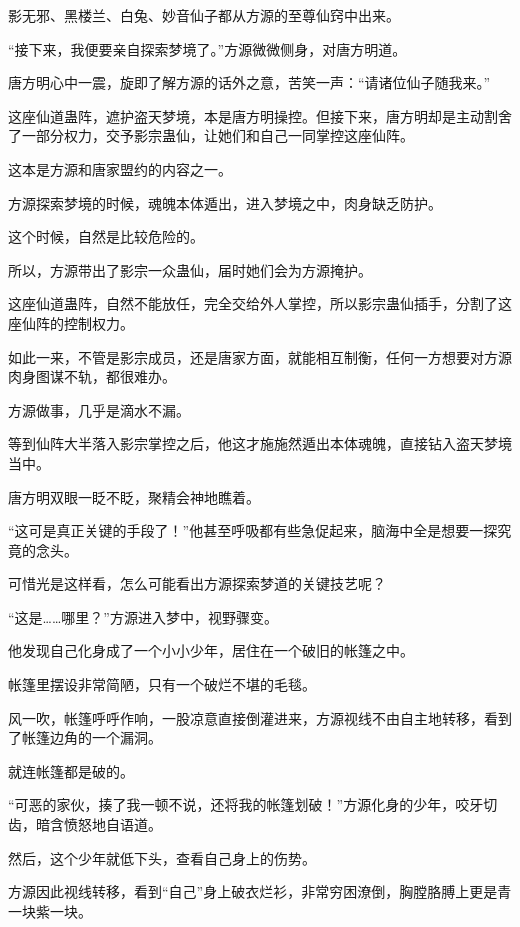 
\begin{this_body}

影无邪、黑楼兰、白兔、妙音仙子都从方源的至尊仙窍中出来。

“接下来，我便要亲自探索梦境了。”方源微微侧身，对唐方明道。

唐方明心中一震，旋即了解方源的话外之意，苦笑一声：“请诸位仙子随我来。”

这座仙道蛊阵，遮护盗天梦境，本是唐方明操控。但接下来，唐方明却是主动割舍了一部分权力，交予影宗蛊仙，让她们和自己一同掌控这座仙阵。

这本是方源和唐家盟约的内容之一。

方源探索梦境的时候，魂魄本体遁出，进入梦境之中，肉身缺乏防护。

这个时候，自然是比较危险的。

所以，方源带出了影宗一众蛊仙，届时她们会为方源掩护。

这座仙道蛊阵，自然不能放任，完全交给外人掌控，所以影宗蛊仙插手，分割了这座仙阵的控制权力。

如此一来，不管是影宗成员，还是唐家方面，就能相互制衡，任何一方想要对方源肉身图谋不轨，都很难办。

方源做事，几乎是滴水不漏。

等到仙阵大半落入影宗掌控之后，他这才施施然遁出本体魂魄，直接钻入盗天梦境当中。

唐方明双眼一眨不眨，聚精会神地瞧着。

“这可是真正关键的手段了！”他甚至呼吸都有些急促起来，脑海中全是想要一探究竟的念头。

可惜光是这样看，怎么可能看出方源探索梦道的关键技艺呢？

“这是……哪里？”方源进入梦中，视野骤变。

他发现自己化身成了一个小小少年，居住在一个破旧的帐篷之中。

帐篷里摆设非常简陋，只有一个破烂不堪的毛毯。

风一吹，帐篷呼呼作响，一股凉意直接倒灌进来，方源视线不由自主地转移，看到了帐篷边角的一个漏洞。

就连帐篷都是破的。

“可恶的家伙，揍了我一顿不说，还将我的帐篷划破！”方源化身的少年，咬牙切齿，暗含愤怒地自语道。

然后，这个少年就低下头，查看自己身上的伤势。

方源因此视线转移，看到“自己”身上破衣烂衫，非常穷困潦倒，胸膛胳膊上更是青一块紫一块。


\end{this_body}
